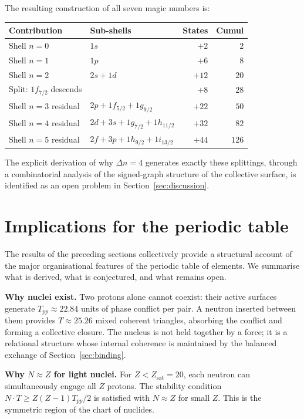 \documentclass[11pt,a4paper]{article}
\theoremstyle{definition}
\newcommand{\Zsat}{Z_{\mathrm{sat}}}
\newcommand{\Tpp}{T_{pp}}
\begin{document}
\medskip The resulting construction of all seven magic numbers is:

\begin{center}
\begin{tabular}{llrr}
\hline
Contribution & Sub-shells & States & Cumul \\
\hline
Shell $n=0$ & $1s$ & $+2$ & $2$ \\
Shell $n=1$ & $1p$ & $+6$ & $8$ \\
Shell $n=2$ & $2s + 1d$ & $+12$ & $20$ \\
Split: $1f_{7/2}$ descends & & $+8$ & $28$ \\
Shell $n=3$ residual & $2p + 1f_{5/2} + 1g_{9/2}$ & $+22$ & $50$ \\
Shell $n=4$ residual & $2d + 3s + 1g_{7/2} + 1h_{11/2}$ & $+32$ & $82$ \\
Shell $n=5$ residual & $2f + 3p + 1h_{9/2} + 1i_{13/2}$ & $+44$ & $126$ \\
\hline
\end{tabular}
\end{center}

\medskip\noindent The explicit derivation of why $\Delta n = 4$ generates exactly these splittings, through a combinatorial analysis of the signed-graph structure of the collective surface, is identified as an open problem in Section~\ref{sec:discussion}.

\section{Implications for the periodic table}
\label{sec:periodic}

The results of the preceding sections collectively provide a structural account of the major organisational features of the periodic table of elements. We summarise what is derived, what is conjectured, and what remains open.

\medskip\noindent\textbf{Why nuclei exist.} Two protons alone cannot coexist: their active surfaces generate $\Tpp \approx 22.84$ units of phase conflict per pair. A neutron inserted between them provides $T \approx 25.26$ mixed coherent triangles, absorbing the conflict and forming a collective closure. The nucleus is not held together by a force; it is a relational structure whose internal coherence is maintained by the balanced exchange of Section~\ref{sec:binding}.

\medskip\noindent\textbf{Why $N \approx Z$ for light nuclei.} For $Z < \Zsat = 20$, each neutron can simultaneously engage all $Z$ protons. The stability condition $N \cdot T \geq Z(Z-1)\Tpp/2$ is satisfied with $N \approx Z$ for small $Z$. This is the symmetric region of the chart of nuclides.
\end{document}
